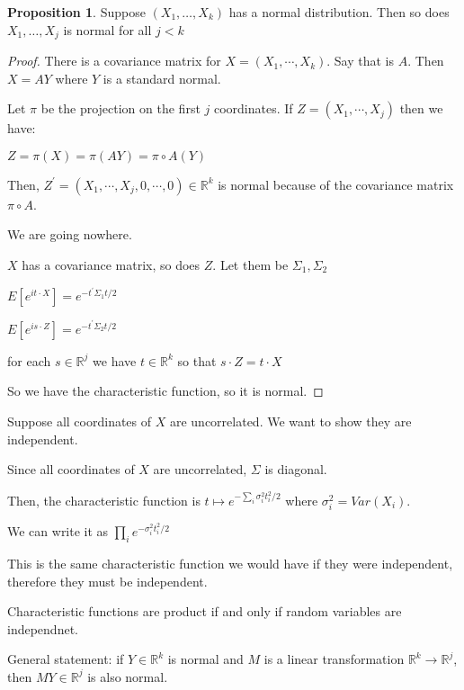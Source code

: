 \documentclass{article}
\theoremstyle{definition}
\newtheorem{proposition}{Proposition}
\begin{document}
\begin{proposition}
    Suppose \((X_1, \dots, X_k )\) has a normal distribution. Then so does \(X_1,\dots, X_j\) is normal for all \(j < k\)
\end{proposition}  

\begin{proof}
    There is a covariance matrix for \(X = (X_1,\cdots, X_k)\). Say that is \(A\). Then \(X = AY\) where \(Y\) is a standard normal.
    
    Let \(\pi\) be the projection on the first \(j\) coordinates. If \(Z = (X_1,\cdots, X_j)\) then we have:

    \(Z = \pi(X) = \pi(AY)=\pi\circ A(Y)\)
    
    Then, \(Z^{\prime} = (X_1,\cdots,X_j,0,\cdots, 0)\in\mathbb{R}^k\) is normal because of the covariance matrix \(\pi\circ A\).

    We are going nowhere.

    \(X\) has a covariance matrix, so does \(Z\). Let them be \(\Sigma_1,\Sigma_2\) 
    
    \(E[e^{it\cdot X}] = e^{-t^{\prime} \Sigma_1 t / 2}\) 

    \(E[e^{is\cdot Z}] = e^{-t^{\prime} \Sigma _2 t / 2}\)
    
    for each \(s\in\mathbb{R}^j\) we have \(t\in\mathbb{R} ^k\) so that \(s\cdot Z = t\cdot X\) 

    So we have the characteristic function, so it is normal.

\end{proof}

Suppose all coordinates of \(X\) are uncorrelated. We want to show they are independent.

Since all coordinates of \(X\) are uncorrelated, \(\Sigma\) is diagonal.

Then, the characteristic function is \(t \mapsto e^{-\sum_{i} \sigma_i^2 t_i^2 / 2}\) where \(\sigma_i^2=Var(X_i)\).

We can write it as \(\prod_i e^{-\sigma_i^2 t_i^2 / 2}\) 

This is the same characteristic function we would have if they were independent, therefore they must be independent.

Characteristic functions are product if and only if random variables are independnet.

General statement: if \(Y\in\mathbb{R}^k\) is normal and \(M\) is a linear transformation \(\mathbb{R}^k \to \mathbb{R} ^j\), then \(MY\in\mathbb{R}^j\) is also normal.
\end{document}
